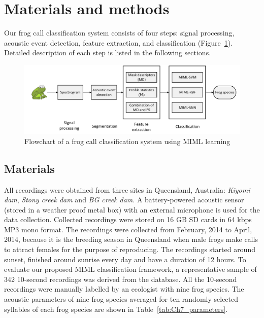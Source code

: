 \section{Materials and methods}
Our frog call classification system consists of
four steps: signal processing, acoustic event detection, feature
extraction, and classification (Figure~\ref{fig:flowchart}). Detailed description of each step is listed in the following sections. 

\begin{figure}[htb!]
\centering
\includegraphics[width=\textwidth]{image/Ch6/flowchart.pdf}
\caption{Flowchart of a frog call classification system using MIML learning}
\label{fig:flowchart}
\end{figure}


\subsection{Materials}
\label{chap5:Materials}

All recordings were obtained from three sites in Queensland, Australia: \textit{Kiyomi dam}, \textit{Stony creek dam} and  \textit{BG creek dam}.
A battery-powered acoustic sensor (stored in a weather proof metal box) with an external microphone is used for the data collection. Collected recordings were stored on 16 GB SD cards in 64 kbps MP3 mono format. 
The recordings were collected from February, 2014 to April, 2014, because it is the breeding season in Queensland when male frogs make calls to attract females for the purpose of reproducing. The recordings started around sunset, finished around sunrise every day and have a duration of 12 hours. To evaluate our proposed MIML classification framework, a representative sample of 342 10-second recordings was derived from the database. All the 10-second recordings were manually labelled by an ecologist with nine frog species. The acoustic parameters of nine frog species averaged for ten randomly selected syllables of each frog species are shown in Table~\ref{tab:Ch7_parameters}. 


